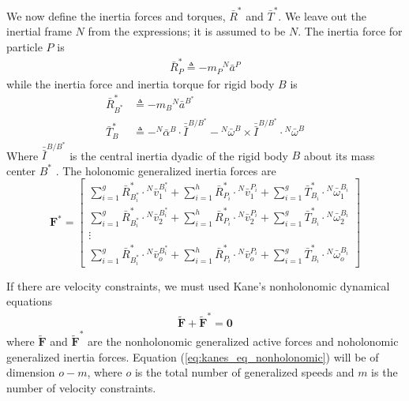 \documentclass[smallcondensed,final]{svjour3}                     %
\begin{document}
We now define the inertia forces and torques, $\bar{R}^*$ and $\bar{T}^*$. We
leave out the inertial frame $N$ from the expressions; it is assumed to be $N$.
The inertia force for particle $P$ is
\begin{align}
\label{eq:particle_gen_inertia}
\bar{R}^*_P \triangleq -m_P {^N}\bar{a}^P
\end{align}
while the inertia force and inertia torque for rigid body $B$ is
\begin{align}
\label{eq:rb_translational_gen_inertia}
\bar{R}^*_{B^*} &\triangleq -m_B {^N}\bar{a}^{B^*} \\
\label{eq:rb_rotational_gen_inertia}
\bar{T}^*_B &\triangleq -{^N}\bar{\alpha}^B \cdot \bar{\bar{I}}^{B/B^*} -
{^N}\bar{\omega}^B \times \bar{\bar{I}}^{B/B^*} \cdot {^N}\bar{\omega}^B
\end{align}
Where $\bar{\bar{I}}^{B/B^*}$ is the central inertia dyadic of the rigid body
$B$ about its mass center $B^*$ \cite{Kane1985}. The holonomic generalized inertia forces
are
\begin{equation}
\label{eq:definition_Fstar}
\mathbf{F}^* =
\begin{bmatrix}
\displaystyle \sum_{i=1}^g \bar{R}^*_{B^*_i} \cdot {^N}\bar{v}^{B^*_i}_1 +
\sum_{i=1}^h \bar{R}^*_{P_i} \cdot {^N}\bar{v}^{P_i}_1 +
\sum_{i=1}^g \bar{T}^*_{B_i} \cdot {^N}\bar{\omega}^{B_i}_1 \\
\displaystyle \sum_{i=1}^g \bar{R}^*_{B^*_i} \cdot {^N}\bar{v}^{B^*_i}_2 +
\sum_{i=1}^h \bar{R}^*_{P_i} \cdot {^N}\bar{v}^{P_i}_2 +
\sum_{i=1}^g \bar{T}^*_{B_i} \cdot {^N}\bar{\omega}^{B_i}_2 \\
\displaystyle \vdots \\
\displaystyle \sum_{i=1}^g \bar{R}^*_{B^*_i} \cdot {^N}\bar{v}^{B^*_i}_o +
\sum_{i=1}^h \bar{R}^*_{P_i} \cdot {^N}\bar{v}^{P_i}_o +
\sum_{i=1}^g \bar{T}^*_{B_i} \cdot {^N}\bar{\omega}^{B_i}_o
\end{bmatrix}
\end{equation}

If there are velocity constraints, we must used Kane's nonholonomic dynamical
equations
\begin{align}
\label{eq:kanes_eq_nonholonomic}
\tilde{\mathbf{F}} + \tilde{\mathbf{F}}^* = \mathbf{0}
\end{align}
where $\tilde{\mathbf{F}}$ and $\tilde{\mathbf{F}}^*$ are the nonholonomic
generalized active forces and noholonomic generalized inertia forces.  Equation
(\ref{eq:kanes_eq_nonholonomic}) will be of dimension $o - m$, where $o$ is the
total number of generalized speeds and $m$ is the number of velocity
constraints.
\end{document}
